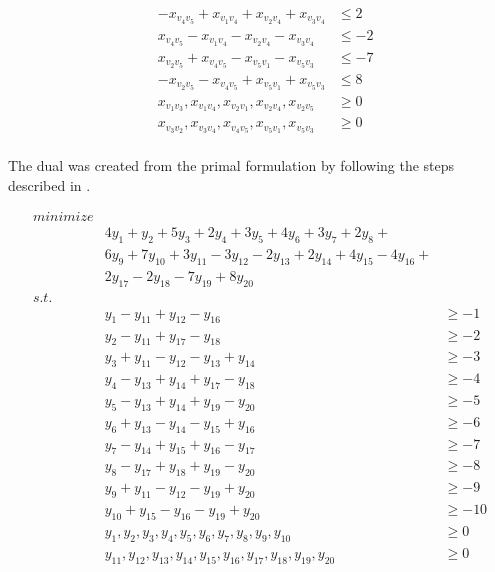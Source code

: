 \documentclass[11pt,a4paper]{article}
\begin{document}
\begin{align*}
             &  -x_{v_4v_5} + x_{v_1v_4} + x_{v_2v_4} + x_{v_3v_4} &\leq 2 \\
             &  x_{v_4v_5} - x_{v_1v_4} - x_{v_2v_4} - x_{v_3v_4}  &\leq -2 \\
             &  x_{v_2v_5} + x_{v_4v_5} - x_{v_5v_1} - x_{v_5v_3}  &\leq -7 \\ 
             &  -x_{v_2v_5} - x_{v_4v_5} + x_{v_5v_1} + x_{v_5v_3} &\leq 8 \\
             &  x_{v_1v_3}, x_{v_1v_4}, x_{v_2v_1}, x_{v_2v_4}, x_{v_2v_5} &\geq 0\\
             &  x_{v_3v_2}, x_{v_3v_4}, x_{v_4v_5}, x_{v_5v_1}, x_{v_5v_3} &\geq 0
\end{align*}
\\
\noindent The dual was created from the primal formulation by following the steps described in \cite[p. 880]{Cormen}. 

\begin{align*}
    minimize & \\
             & 4y_1 + y_2 + 5y_3 + 2y_4 + 3y_5 + 4y_6 + 3y_7 + 2y_8 +\\ 
             & 6y_9 + 7y_{10} + 3y_{11} - 3y_{12} - 2y_{13} + 2y_{14} + 4y_{15} - 4y_{16} + \\
             & 2y_{17} - 2y_{18} - 7y_{19} + 8y_{20} \\
    s.t.     & \\
             & y_1 - y_{11} + y_{12} - y_{16}  &\geq -1 \\
             & y_2 - y_{11} + y_{17} - y_{18}  &\geq -2 \\
             & y_3 + y_{11} - y_{12} - y_{13} + y_{14} &\geq -3 \\
             & y_4 - y_{13} + y_{14} + y_{17} - y_{18} &\geq -4 \\
             & y_5 - y_{13} + y_{14} + y_{19} - y_{20} &\geq -5 \\
             & y_6 + y_{13} - y_{14} - y_{15} + y_{16} &\geq -6 \\
             & y_7 - y_{14} + y_{15} + y_{16} - y_{17} &\geq -7 \\
             & y_8 - y_{17} + y_{18} + y_{19} - y_{20} &\geq -8 \\
             & y_9 + y_{11} - y_{12} - y_{19} + y_{20} &\geq -9 \\
             & y_{10} + y_{15} - y_{16} - y_{19} + y_{20}  &\geq -10 \\
             &  y_{1}, y_{2}, y_{3}, y_{4}, y_{5}, y_{6}, y_{7}, y_{8}, y_{9}, y_{10} &\geq 0\\
             &  y_{11}, y_{12}, y_{13}, y_{14}, y_{15}, y_{16}, y_{17}, y_{18}, y_{19}, y_{20} &\geq 0
\end{align*}
\end{document}
